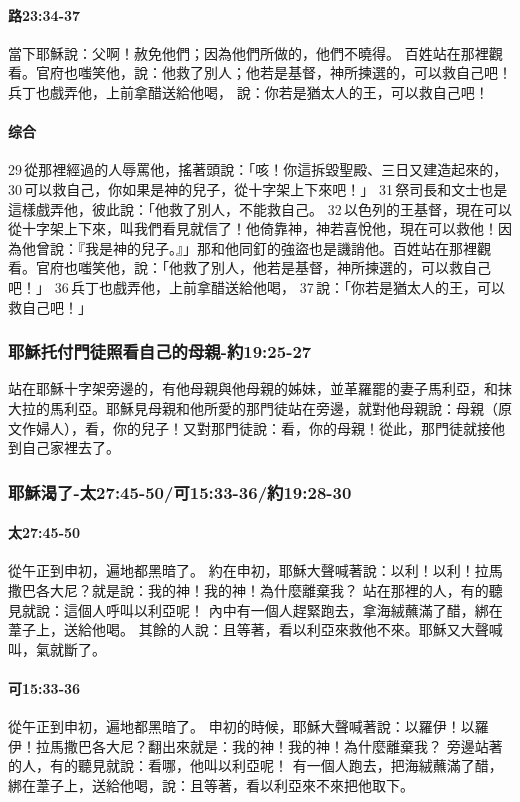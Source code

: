 \paragraph{路23:34-37}
當下耶穌說：父啊！赦免他們；因為他們所做的，他們不曉得。
百姓站在那裡觀看。官府也嗤笑他，說：他救了別人；他若是基督，神所揀選的，可以救自己吧！
兵丁也戲弄他，上前拿醋送給他喝，
說：你若是猶太人的王，可以救自己吧！
\paragraph{综合}
29 從那裡經過的人辱罵他，搖著頭說：「咳！你這拆毀聖殿、三日又建造起來的， 30 可以救自己，你如果是神的兒子，從十字架上下來吧！」 31 祭司長和文士也是這樣戲弄他，彼此說：「他救了別人，不能救自己。 32 以色列的王基督，現在可以從十字架上下來，叫我們看見就信了！他倚靠神，神若喜悅他，現在可以救他！因為他曾說：『我是神的兒子。』」那和他同釘的強盜也是譏誚他。百姓站在那裡觀看。官府也嗤笑他，說：「他救了別人，他若是基督，神所揀選的，可以救自己吧！」 36 兵丁也戲弄他，上前拿醋送給他喝， 37 說：「你若是猶太人的王，可以救自己吧！」

\subsubsection{耶穌托付門徒照看自己的母親-約19:25-27}
站在耶穌十字架旁邊的，有他母親與他母親的姊妹，並革羅罷的妻子馬利亞，和抹大拉的馬利亞。耶穌見母親和他所愛的那門徒站在旁邊，就對他母親說：母親（原文作婦人），看，你的兒子！又對那門徒說：看，你的母親！從此，那門徒就接他到自己家裡去了。

\subsubsection{耶穌渴了-太27:45-50/可15:33-36/約19:28-30}
\paragraph{太27:45-50}
從午正到申初，遍地都黑暗了。
約在申初，耶穌大聲喊著說：以利！以利！拉馬撒巴各大尼？就是說：我的神！我的神！為什麼離棄我？
站在那裡的人，有的聽見就說：這個人呼叫以利亞呢！
內中有一個人趕緊跑去，拿海絨蘸滿了醋，綁在葦子上，送給他喝。
其餘的人說：且等著，看以利亞來救他不來。耶穌又大聲喊叫，氣就斷了。
\paragraph{可15:33-36}
從午正到申初，遍地都黑暗了。
申初的時候，耶穌大聲喊著說：以羅伊！以羅伊！拉馬撒巴各大尼？翻出來就是：我的神！我的神！為什麼離棄我？
旁邊站著的人，有的聽見就說：看哪，他叫以利亞呢！
有一個人跑去，把海絨蘸滿了醋，綁在葦子上，送給他喝，說：且等著，看以利亞來不來把他取下。

